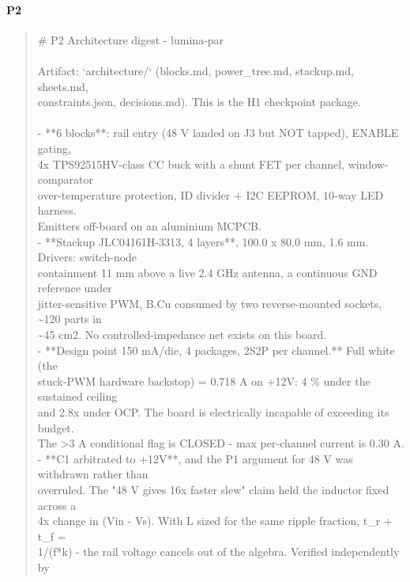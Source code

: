 \documentclass[11pt,a4paper]{article}
\begin{document}
\paragraph*{P2}
\begin{quote}\small\ttfamily\raggedright
\# P2 Architecture digest - lumina-par\\
~\\
Artifact: `architecture/` (blocks.md, power\_tree.md, stackup.md, sheets.md,\\
constraints.json, decisions.md). This is the H1 checkpoint package.\\
~\\
- {*}{*}6 blocks{*}{*}: rail entry (48 V landed on J3 but NOT tapped), ENABLE gating,\\
  4x TPS92515HV-class CC buck with a shunt FET per channel, window-comparator\\
  over-temperature protection, ID divider + I2C EEPROM, 10-way LED harness.\\
  Emitters off-board on an aluminium MCPCB.\\
- {*}{*}Stackup JLC04161H-3313, 4 layers{*}{*}, 100.0 x 80.0 mm, 1.6 mm. Drivers: switch-node\\
  containment 11 mm above a live 2.4 GHz antenna, a continuous GND reference under\\
  jitter-sensitive PWM, B.Cu consumed by two reverse-mounted sockets, \textasciitilde{}120 parts in\\
  \textasciitilde{}45 cm2. No controlled-impedance net exists on this board.\\
- {*}{*}Design point 150 mA/die, 4 packages, 2S2P per channel.{*}{*} Full white (the\\
  stuck-PWM hardware backstop) = 0.718 A on +12V: 4 \% under the sustained ceiling\\
  and 2.8x under OCP. The board is electrically incapable of exceeding its budget.\\
  The \textgreater{}3 A conditional flag is CLOSED - max per-channel current is 0.30 A.\\
- {*}{*}C1 arbitrated to +12V{*}{*}, and the P1 argument for 48 V was withdrawn rather than\\
  overruled. The "48 V gives 16x faster slew" claim held the inductor fixed across a\\
  4x change in (Vin - Vs). With L sized for the same ripple fraction, t\_r + t\_f =\\
  1/(f{*}k) - the rail voltage cancels out of the algebra. Verified independently by\\

\end{quote}
\end{document}
